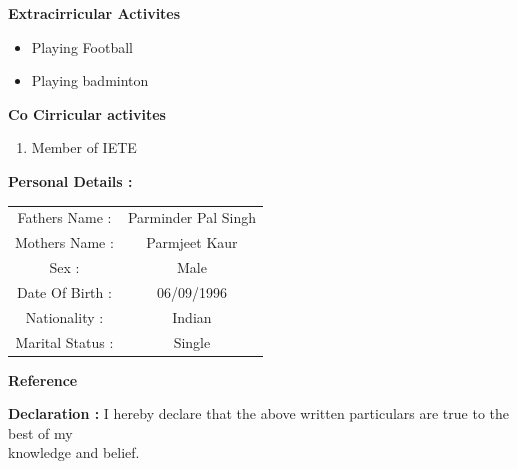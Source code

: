 \documentclass{article}
\begin{document}
\begin{flushleft}
\textbf{Extracirricular Activites}
\begin{flushright}
\begin{itemize}
\item Playing Football
\item Playing badminton
\end{itemize} 
\end{flushright}
\end{flushleft}



\begin{flushleft}
\textbf{Co Cirricular activites }
\begin{flushright}
\begin{enumerate}
\item Member of IETE
\end{enumerate} 
\end{flushright}
\end{flushleft}



\begin{flushleft}
\textbf {Personal Details :  }
\vskip 0.2cm
\hspace{1.4in}
\begin{tabular}{ cc } 
 \hfill Fathers Name : & Parminder Pal Singh \\ 
 \hfill Mothers Name : & Parmjeet Kaur \\  
 \hfill Sex : & Male   \\ 
 \hfill Date Of Birth : & 06/09/1996  \\
 \hfill Nationality : & Indian  \\
 \hfill Marital Status : & Single
\end{tabular}
\end{flushleft}





\begin{flushleft}
\textbf{Reference}
\end{flushleft}

\vskip 0.3cm


\begin{flushleft}
\textbf{Declaration : }
 I hereby declare that the above written particulars are true to the best of my \\
\hspace{1in}
knowledge and belief.
\end{flushleft}
\end{document}

